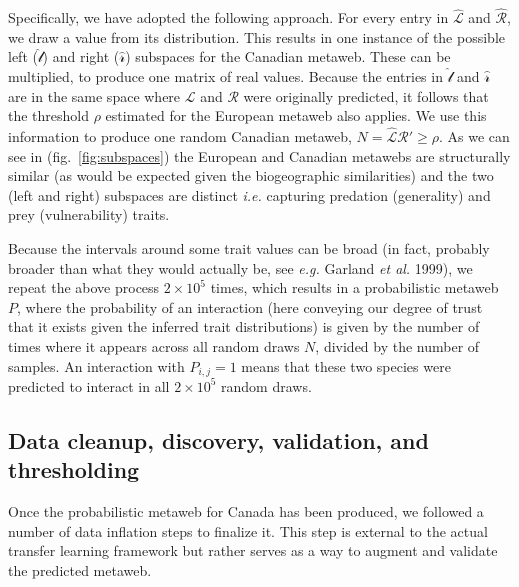 \documentclass[10pt,oneside]{article}
\begin{document}
Specifically, we have adopted the following approach. For every entry in
\(\hat{\mathscr{L}}\) and \(\hat{\mathscr{R}}\), we draw a value from
its distribution. This results in one instance of the possible left
(\(\hat{\mathscr{l}}\)) and right (\(\hat{\mathscr{r}}\)) subspaces for
the Canadian metaweb. These can be multiplied, to produce one matrix of
real values. Because the entries in \(\hat{\mathscr{l}}\) and
\(\hat{\mathscr{r}}\) are in the same space where \(\mathscr{L}\) and
\(\mathscr{R}\) were originally predicted, it follows that the threshold
\(\rho\) estimated for the European metaweb also applies. We use this
information to produce one random Canadian metaweb,
\(N = \hat{\mathscr{L}}\)\(\hat{\mathscr{R}}' \ge \rho\). As we can see
in (fig.~\ref{fig:subspaces}) the European and Canadian metawebs are
structurally similar (as would be expected given the biogeographic
similarities) and the two (left and right) subspaces are distinct
\emph{i.e.} capturing predation (generality) and prey (vulnerability)
traits.

Because the intervals around some trait values can be broad (in fact,
probably broader than what they would actually be, see \emph{e.g.}
Garland \emph{et al.} 1999), we repeat the above process
\(2\times 10^5\) times, which results in a probabilistic metaweb \(P\),
where the probability of an interaction (here conveying our degree of
trust that it exists given the inferred trait distributions) is given by
the number of times where it appears across all random draws \(N\),
divided by the number of samples. An interaction with \(P_{i,j} = 1\)
means that these two species were predicted to interact in all
\(2\times 10^5\) random draws.

\hypertarget{data-cleanup-discovery-validation-and-thresholding}{%
\subsection{Data cleanup, discovery, validation, and
thresholding}\label{data-cleanup-discovery-validation-and-thresholding}}

Once the probabilistic metaweb for Canada has been produced, we followed
a number of data inflation steps to finalize it. This step is external
to the actual transfer learning framework but rather serves as a way to
augment and validate the predicted metaweb.
\end{document}
